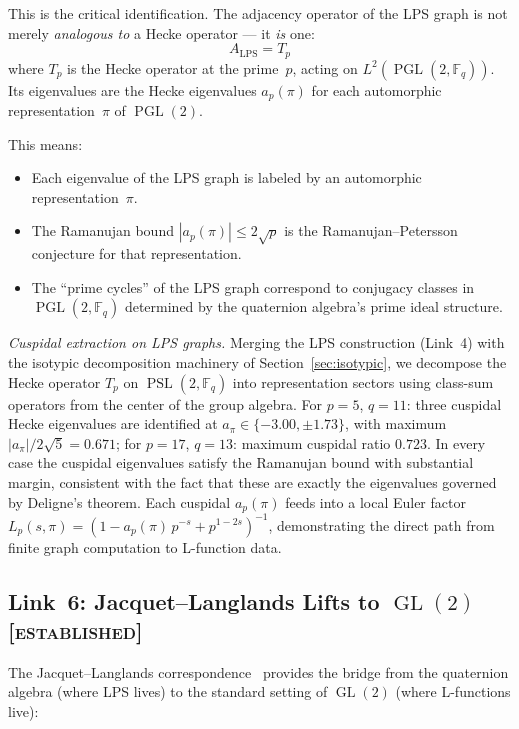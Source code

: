 \documentclass[12pt,reqno]{amsart}
\theoremstyle{plain}
\theoremstyle{definition}
\theoremstyle{remark}
\DeclareMathOperator{\GL}{GL}
\DeclareMathOperator{\PGL}{PGL}
\DeclareMathOperator{\PSL}{PSL}
\newcommand{\FF}{\mathbb{F}}
\begin{document}
This is the critical identification.  The adjacency operator of the
LPS graph is not merely \emph{analogous to} a Hecke operator --- it
\emph{is} one:
\begin{equation}\label{eq:lps_hecke}
  A_{\mathrm{LPS}} = T_p
\end{equation}
where $T_p$ is the Hecke operator at the prime~$p$, acting on
$L^2(\PGL(2, \FF_q))$.  Its eigenvalues are the Hecke eigenvalues
$a_p(\pi)$ for each automorphic representation~$\pi$ of
$\PGL(2)$.

This means:
\begin{itemize}[nosep]
  \item Each eigenvalue of the LPS graph is labeled by an automorphic
    representation~$\pi$.
  \item The Ramanujan bound $|a_p(\pi)| \leq 2\sqrt{p}$ is the
    Ramanujan--Petersson conjecture for that representation.
  \item The ``prime cycles'' of the LPS graph correspond to conjugacy
    classes in $\PGL(2, \FF_q)$ determined by the quaternion algebra's
    prime ideal structure.
\end{itemize}

\emph{Cuspidal extraction on LPS graphs.}  Merging the LPS construction
(Link~4) with the isotypic decomposition machinery of
Section~\ref{sec:isotypic}, we decompose the Hecke operator $T_p$ on
$\PSL(2, \FF_q)$ into representation sectors using class-sum operators
from the center of the group algebra.  For $p = 5$, $q = 11$: three
cuspidal Hecke eigenvalues are identified at $a_\pi \in \{-3.00,
\pm 1.73\}$, with maximum $|a_\pi| / 2\sqrt{5} = 0.671$; for
$p = 17$, $q = 13$: maximum cuspidal ratio $0.723$.  In every case the
cuspidal eigenvalues satisfy the Ramanujan bound with substantial
margin, consistent with the fact that these are exactly the eigenvalues
governed by Deligne's theorem.  Each cuspidal $a_p(\pi)$ feeds into
a local Euler factor
$L_p(s, \pi) = (1 - a_p(\pi)\, p^{-s} + p^{1-2s})^{-1}$,
demonstrating the direct path from finite graph computation to
L-function data.

\subsection{Link~6: Jacquet--Langlands Lifts to $\GL(2)$
  \textnormal{[\textsc{established}]}}

The Jacquet--Langlands correspondence~\cite{jacquet_langlands1970}
provides the bridge from the quaternion algebra (where LPS lives) to
the standard setting of $\GL(2)$ (where L-functions live):
\end{document}
